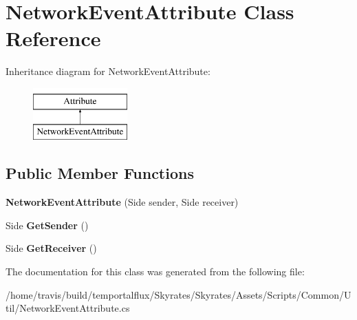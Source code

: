 \hypertarget{class_network_event_attribute}{\section{Network\-Event\-Attribute Class Reference}
\label{class_network_event_attribute}
}
Inheritance diagram for Network\-Event\-Attribute\-:\begin{figure}[H]
\begin{center}
\leavevmode
\includegraphics[height=2.000000cm]{class_network_event_attribute}
\end{center}
\end{figure}
\subsection*{Public Member Functions}
\begin{DoxyCompactItemize}
\item 
\hypertarget{class_network_event_attribute_a37f028d06b48737388c7bea1b2bc321f}{{\bfseries Network\-Event\-Attribute} (Side sender, Side receiver)}\label{class_network_event_attribute_a37f028d06b48737388c7bea1b2bc321f}

\item 
\hypertarget{class_network_event_attribute_a231e017da0e2f1b9887e2343d2792aaa}{Side {\bfseries Get\-Sender} ()}\label{class_network_event_attribute_a231e017da0e2f1b9887e2343d2792aaa}

\item 
\hypertarget{class_network_event_attribute_a66ffbebae7e327f9e551fa754379effc}{Side {\bfseries Get\-Receiver} ()}\label{class_network_event_attribute_a66ffbebae7e327f9e551fa754379effc}

\end{DoxyCompactItemize}


The documentation for this class was generated from the following file\-:\begin{DoxyCompactItemize}
\item 
/home/travis/build/temportalflux/\-Skyrates/\-Skyrates/\-Assets/\-Scripts/\-Common/\-Util/Network\-Event\-Attribute.\-cs\end{DoxyCompactItemize}
